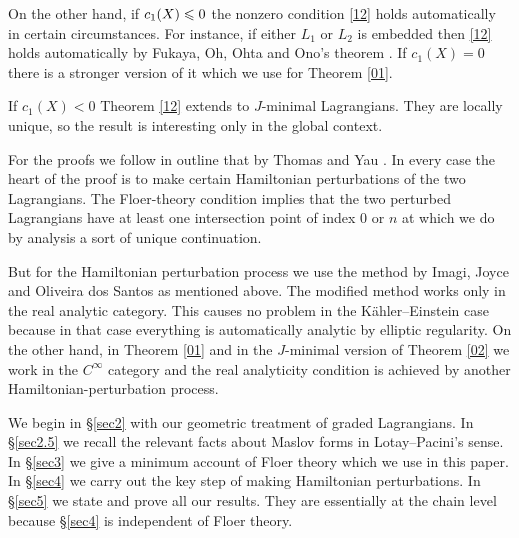 \documentclass{article}
\theoremstyle{plain}%
\theoremstyle{definition}
\numberwithin{equation}{section}
\numberwithin{figure}{section}
\def\eq{\eqref}
\def\le{\leqslant\nobreak}
\def\iy{\infty}
\begin{document}
On the other hand, if $c_1(X)\le0$ the nonzero condition \eq{12} holds automatically in certain circumstances.
For instance, if either $L_1$ or $L_2$ is embedded then \eq{12} holds automatically by
Fukaya, Oh, Ohta and Ono's theorem \cite[Theorem E]{FOOO}.
If $c_1(X)=0$ there is a stronger version of it which we use for Theorem \ref{01}. 

If $c_1(X)<0$ Theorem \ref{12} extends to $J$-minimal Lagrangians.
They are locally unique, so the result is interesting only in the global context.

For the proofs we follow in outline that by Thomas and Yau \cite[Theorem 4.3]{TY}.
In every case the heart of the proof is to
make certain Hamiltonian perturbations of the two Lagrangians.
The Floer-theory condition implies that the two perturbed Lagrangians have at least one intersection point of index $0$ or $n$
at which we do by analysis a sort of unique continuation.

But for the Hamiltonian perturbation process we use the method by
Imagi, Joyce and Oliveira dos Santos \cite[Theorem 4.7]{IJO} as mentioned above.
The modified method works only in the real analytic category.
This causes no problem in the K\"ahler--Einstein case because
in that case everything is automatically analytic by elliptic regularity.
On the other hand, in Theorem \ref{01} and in the $J$-minimal version of Theorem \ref{02}
we work in the $C^\iy$ category
and the real analyticity condition is achieved by another Hamiltonian-perturbation process.

We begin in \S\ref{sec2} with our geometric treatment of graded Lagrangians.
In \S\ref{sec2.5} we recall the relevant facts about Maslov forms in Lotay--Pacini's sense.
In \S\ref{sec3} we give a minimum account of Floer theory which we use in this paper. 
In \S\ref{sec4} we carry out the key step of making Hamiltonian perturbations.
In \S\ref{sec5} we state and prove all our results.
They are essentially at the chain level because \S\ref{sec4} is independent of Floer theory.
\end{document}
